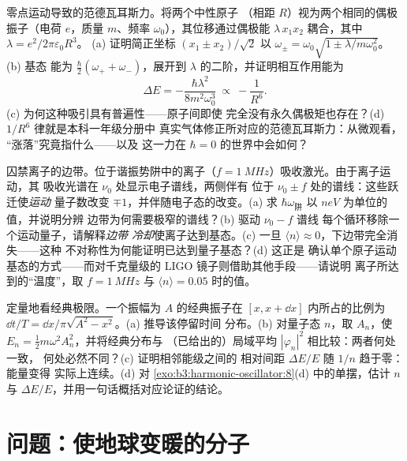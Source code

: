 \begin{exercise}[$\star\star\star$]\label{exo:b3:harmonic-oscillator:10}
零点运动导致的范德瓦耳斯力。将两个中性原子
（相距 $R$）视为两个相同的偶极振子（电荷 $e$，质量
$m$、频率 $\omega_0$），其位移通过偶极能
$\lambda\,x_1x_2$ 耦合，其中 $\lambda = e^2/2\pi\varepsilon_0R^3$。
(a) 证明简正坐标 $(x_1 \pm x_2)/\sqrt2$ 以
$\omega_\pm = \omega_0\sqrt{1 \pm \lambda/m\omega_0^2}$。(b) 基态
能为 $\tfrac\hbar2(\omega_+ + \omega_-)$，展开到
$\lambda$ 的二阶，并证明相互作用能为
\[
\Delta E = -\frac{\hbar\lambda^2}{8m^2\omega_0^3}
\ \propto\ -\frac{1}{R^6} .
\]
(c) 为何这种吸引具有普遍性——原子间即使
完全没有永久偶极矩也存在？(d) $1/R^6$ 律就是本科一年级分册中
真实气体修正所对应的范德瓦耳斯力：从微观看，
“涨落”究竟指什么——以及
这一力在 $\hbar = 0$ 的世界中会如何？
\end{exercise}

\begin{exercise}[$\star\star\star$]\label{exo:b3:harmonic-oscillator:11}
囚禁离子的边带。位于谐振势阱中的离子（$f =
\qty{1}{MHz}$）吸收激光。由于离子运动，其
吸收光谱在 $\nu_0$ 处显示电子谱线，两侧伴有
位于 $\nu_0 \pm f$ 处的谱线：这些跃迁使\emph{运动}
量子数改变 $\mp1$，并伴随电子态的改变。(a) 求
$\hbar\omega_{\text{阱}}$ 以 $\unit{neV}$ 为单位的值，并说明分辨
边带为何需要极窄的谱线？(b) 驱动 $\nu_0 - f$ 谱线
每个循环移除一个运动量子，请解释\emph{边带
冷却}使离子达到基态。(c) 一旦 $\langle n\rangle \approx
0$，下边带完全消失——这种
不对称性为何能证明已达到量子基态？(d) 这正是
确认单个原子运动基态的方式——而对千克量级的
LIGO 镜子则借助其他手段——请说明
离子所达到的“温度”，取 $f = \qty{1}{MHz}$ 与
$\langle n\rangle = 0.05$ 时的值。
\end{exercise}

\begin{exercise}[$\star\star\star$]\label{exo:b3:harmonic-oscillator:12}
定量地看经典极限。一个振幅为
$A$ 的经典振子在 $[x, x + \dd x]$ 内所占的比例为 $\dd
t/T = \dd x/\pi\sqrt{A^2 - x^2}$。(a) 推导该停留时间
分布。(b) 对量子态 $n$，取 $A_n$，使 $E_n =
\tfrac12 m\omega^2A_n^2$，并将经典分布与
（已给出的）局域平均 $|\varphi_n|^2$ 相比较：两者何处一致，
何处必然不同？(c) 证明相邻能级之间的
相对间距 $\Delta E/E$ 随 $1/n$ 趋于零：能量变得
实际上连续。(d) 对
\cref{exo:b3:harmonic-oscillator:8}(d) 中的单摆，估计 $n$ 与 $\Delta
E/E$，并用一句话概括对应论证的结论。
\end{exercise}

\section{问题：使地球变暖的分子}


